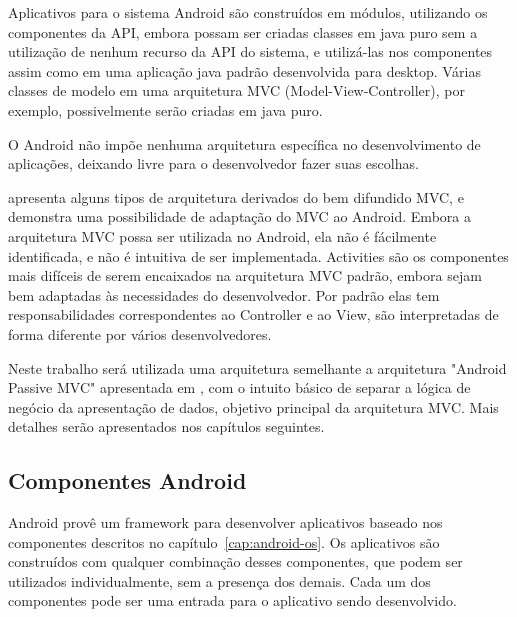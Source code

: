 Aplicativos para o sistema Android são construídos em módulos, utilizando os componentes da API, embora possam ser criadas classes em java puro sem a utilização de nenhum recurso da API do sistema, e utilizá-las nos componentes assim como em uma aplicação java padrão desenvolvida para desktop. Várias classes de modelo em uma arquitetura MVC (Model-View-Controller), por exemplo, possivelmente serão criadas em java puro.

O Android não impõe nenhuma arquitetura específica no desenvolvimento de aplicações, deixando livre para o desenvolvedor fazer suas escolhas.

 apresenta alguns tipos de arquitetura derivados do bem difundido MVC, e demonstra uma possibilidade de adaptação do MVC ao Android. Embora a arquitetura MVC possa ser utilizada no Android, ela não é fácilmente identificada, e não é intuitiva de ser implementada. Activities são os componentes mais difíceis de serem encaixados na arquitetura MVC padrão, embora sejam bem adaptadas às necessidades do desenvolvedor. Por padrão elas tem responsabilidades correspondentes ao Controller e ao View, são interpretadas de forma diferente por vários desenvolvedores.

Neste trabalho será utilizada uma arquitetura semelhante a arquitetura "Android Passive MVC" apresentada em , com o intuito básico de separar a lógica de negócio da apresentação de dados, objetivo principal da arquitetura MVC. Mais detalhes serão apresentados nos capítulos seguintes.

\cite{androidmvc}

\subsection{Componentes Android}

Android provê um framework para desenvolver aplicativos baseado nos componentes descritos no capítulo~\ref{cap:android-os}. Os aplicativos são construídos com qualquer combinação desses componentes, que podem ser utilizados individualmente, sem a presença dos demais. Cada um dos componentes pode ser uma entrada para o aplicativo sendo desenvolvido.

